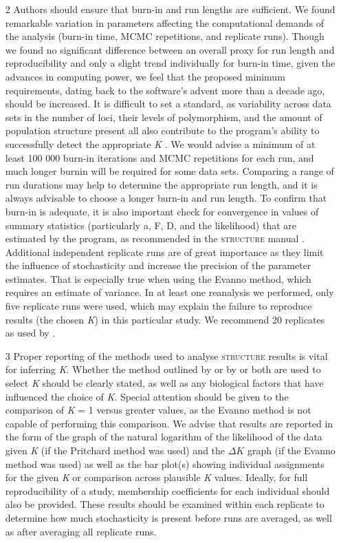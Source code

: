 \begin{itemize}
\item[2] Authors should ensure that burn-in and run lengths are sufficient. We found remarkable variation in 
parameters affecting the computational demands of the analysis (burn-in time, MCMC repetitions, and 
replicate runs). Though we found no significant difference between an overall proxy for run length and 
reproducibility and only a slight trend individually for burn-in time, given the advances in computing 
power, we feel that the proposed minimum requirements, dating back to the software's advent more than a 
decade ago, should be increased. It is difficult to set a standard, as variability across data sets in 
the number of loci, their levels of polymorphism, and the amount of population structure present all 
also contribute to the program's ability to successfully detect the appropriate \emph{K} 
\citep{Rosenberg:2001, Latch:2006, Gao:2007}. We would advise a minimum of at 
least 100 000 burn-in iterations and MCMC repetitions for each run, and much longer burnin will be 
required for some data sets. Comparing a range of run durations may help to determine the appropriate 
run length, and it is always advisable to choose a longer burn-in and run length. To confirm that burn-in 
is adequate, it is also important check for convergence in values of summary statistics (particularly a, 
F, D, and the likelihood) that are estimated by the program, as recommended in the \textsc{structure} 
manual \citep{Pritchard:2007}. Additional independent replicate runs are of great importance as they 
limit the influence of stochasticity and increase the precision of the parameter estimates. That is 
especially true when using the Evanno method, which requires an estimate of variance. In at least one 
reanalysis we performed, only five replicate runs were used, which may explain the failure to reproduce 
results (the chosen \emph{K}) in this particular study. We recommend 20 replicates as used by \citet{Evanno:2005}.

\item[3] Proper reporting of the methods used to analyse \textsc{structure} results is vital for inferring \emph{K}. 
Whether the method outlined by \citet{Pritchard:2000} or by \citet{Evanno:2005} or both are used to select 
\emph{K} should be clearly stated, as well as any biological factors that have influenced the choice of \emph{K}. 
Special attention should be given to the comparison of \emph{K} = 1 versus greater values, as the Evanno method 
is not capable of performing this comparison. We advise that results are reported in the form of the graph of 
the natural logarithm of the likelihood of the data given \emph{K} (if the Pritchard method was used) and the 
$\Delta K$ graph (if the Evanno method was used) as well as the bar plot(s) showing individual assignments for the given 
\emph{K} or comparison across plausible \emph{K} values. Ideally, for full reproducibility of a study, membership 
coefficients for each individual should also be provided. These results should be examined within each replicate 
to determine how much stochasticity is present before runs are averaged, as well as after averaging all replicate runs.
\end{itemize}

